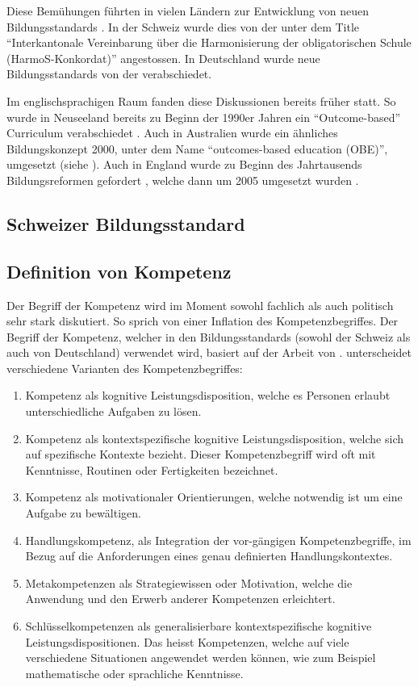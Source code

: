 Diese Bemühungen führten in vielen Ländern zur Entwicklung von neuen Bildungsstandards \citep{Berner2006}. In der Schweiz wurde dies von der \citet{EDKSchweizerKonfernezderKantonalenErziehungsdirektoren2004} unter dem Title "`Interkantonale Vereinbarung über die Harmonisierung der obligatorischen Schule (HarmoS-Konkordat)"' angestossen. In Deutschland wurde neue Bildungsstandards von der \citet{Kultusministerkonferenz2004} verabschiedet.

Im englischsprachigen Raum fanden diese Diskussionen bereits früher statt. So wurde in Neuseeland bereits zu Beginn der 1990er Jahren ein "`Outcome-based"' Curriculum verabschiedet \citep{McGee1996}. Auch in Australien wurde ein ähnliches Bildungskonzept 2000,  unter dem Name "`outcomes-based education (OBE)"', umgesetzt (siehe \citet{Killen2000}). Auch in England wurde zu Beginn des Jahrtausends Bildungsreformen gefordert \citep{Millar1999}, welche dann um 2005 umgesetzt wurden \citep{Huber2006}.

\subsection{Schweizer Bildungsstandard}



\subsection{Definition von Kompetenz}

Der Begriff der Kompetenz wird im Moment sowohl fachlich als auch politisch sehr stark diskutiert. So sprich \citet{Weinert2001b} von einer Inflation des Kompetenzbegriffes.
Der Begriff der Kompetenz, welcher in den Bildungsstandards (sowohl der Schweiz als auch von Deutschland) verwendet wird, basiert auf der Arbeit von \citet{Klieme2004}.
\citet{Klieme2004} unterscheidet verschiedene Varianten des Kompetenzbegriffes: 
\begin{enumerate}
\item Kompetenz als kognitive Leistungsdisposition, welche es Personen erlaubt unterschiedliche Aufgaben zu lösen.
\item Kompetenz als kontextspezifische kognitive Leistungsdisposition, welche sich auf spezifische Kontexte bezieht. Dieser Kompetenzbegriff wird oft mit Kenntnisse, Routinen oder Fertigkeiten bezeichnet.
\item Kompetenz als motivationaler Orientierungen, welche notwendig ist um eine Aufgabe zu bewältigen.
\item Handlungskompetenz, als Integration der vor-gängigen Kompetenzbegriffe, im Bezug auf die Anforderungen eines genau definierten Handlungskontextes.
\item Metakompetenzen als Strategiewissen oder Motivation, welche die Anwendung und den Erwerb anderer Kompetenzen erleichtert.
\item Schlüsselkompetenzen als generalisierbare kontextspezifische kognitive Leistungsdispositionen. Das heisst Kompetenzen, welche auf viele verschiedene Situationen angewendet werden können, wie zum Beispiel mathematische oder sprachliche Kenntnisse.
\end{enumerate}

